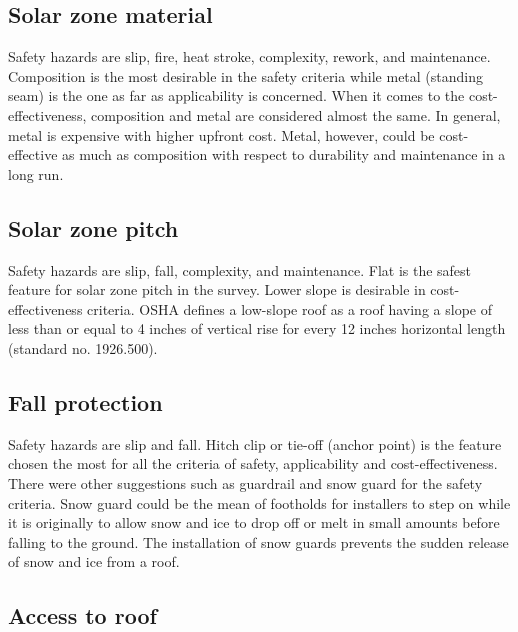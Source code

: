 \documentclass[]{article}
\begin{document}
\hypertarget{solar-zone-material}{%
\subsection{Solar zone material}\label{solar-zone-material}}

Safety hazards are slip, fire, heat stroke, complexity, rework, and
maintenance. Composition is the most desirable in the safety criteria
while metal (standing seam) is the one as far as applicability is
concerned. When it comes to the cost-effectiveness, composition and
metal are considered almost the same. In general, metal is expensive
with higher upfront cost. Metal, however, could be cost-effective as
much as composition with respect to durability and maintenance in a long
run.

\hypertarget{solar-zone-pitch}{%
\subsection{Solar zone pitch}\label{solar-zone-pitch}}

Safety hazards are slip, fall, complexity, and maintenance. Flat is the
safest feature for solar zone pitch in the survey. Lower slope is
desirable in cost-effectiveness criteria. OSHA defines a low-slope roof
as a roof having a slope of less than or equal to 4 inches of vertical
rise for every 12 inches horizontal length (standard no. 1926.500).

\hypertarget{fall-protection}{%
\subsection{Fall protection}\label{fall-protection}}

Safety hazards are slip and fall. Hitch clip or tie-off (anchor point)
is the feature chosen the most for all the criteria of safety,
applicability and cost-effectiveness. There were other suggestions such
as guardrail and snow guard for the safety criteria. Snow guard could be
the mean of footholds for installers to step on while it is originally
to allow snow and ice to drop off or melt in small amounts before
falling to the ground. The installation of snow guards prevents the
sudden release of snow and ice from a roof.

\hypertarget{access-to-roof}{%
\subsection{Access to roof}\label{access-to-roof}}
\end{document}
